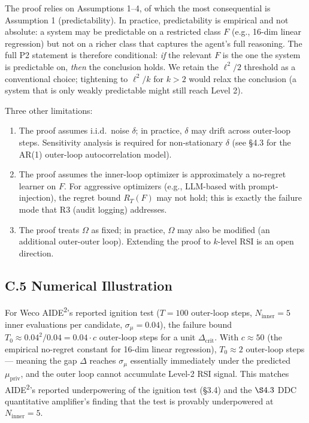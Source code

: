 The proof relies on Assumptions 1--4, of which the most consequential is Assumption 1 (predictability). In practice, predictability is empirical and not absolute: a system may be predictable on a restricted class $F$ (e.g., 16-dim linear regression) but not on a richer class that captures the agent's full reasoning. The full P2 statement is therefore conditional: \emph{if} the relevant $F$ is the one the system is predictable on, \emph{then} the conclusion holds. We retain the $\ell^2/2$ threshold as a conventional choice; tightening to $\ell^2/k$ for $k > 2$ would relax the conclusion (a system that is only weakly predictable might still reach Level 2).

Three other limitations:
\begin{enumerate}
    \item The proof assumes i.i.d.\ noise $\delta$; in practice, $\delta$ may drift across outer-loop steps. Sensitivity analysis is required for non-stationary $\delta$ (see \S4.3 for the AR(1) outer-loop autocorrelation model).
    \item The proof assumes the inner-loop optimizer is approximately a no-regret learner on $F$. For aggressive optimizers (e.g., LLM-based with prompt-injection), the regret bound $R_T(F)$ may not hold; this is exactly the failure mode that R3 (audit logging) addresses.
    \item The proof treats $\Omega$ as fixed; in practice, $\Omega$ may also be modified (an additional outer-outer loop). Extending the proof to $k$-level RSI is an open direction.
\end{enumerate}

\subsection*{C.5 Numerical Illustration}

For Weco AIDE\textsuperscript{2}'s reported ignition test ($T = 100$ outer-loop steps, $N_{\text{inner}} = 5$ inner evaluations per candidate, $\sigma_\mu = 0.04$), the failure bound $T_0 \approx 0.04^2 / 0.04 = 0.04 \cdot c$ outer-loop steps for a unit $\Delta_{\text{crit}}$. With $c \approx 50$ (the empirical no-regret constant for 16-dim linear regression), $T_0 \approx 2$ outer-loop steps --- meaning the gap $\Delta$ reaches $\sigma_\mu$ essentially immediately under the predicted $\mu_{\text{priv}}$, and the outer loop cannot accumulate Level-2 RSI signal. This matches AIDE\textsuperscript{2}'s reported underpowering of the ignition test (\S3.4) and the $\S4.3$ DDC quantitative amplifier's finding that the test is provably underpowered at $N_{\text{inner}} = 5$.

